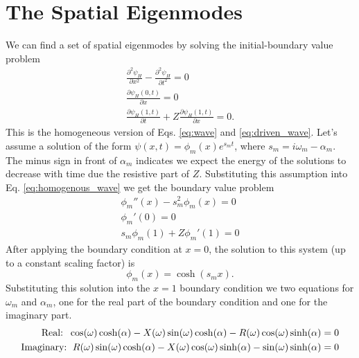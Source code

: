 \documentclass[superscriptaddress, onecolumn, prl]{revtex4}
\begin{document}
\section{The Spatial Eigenmodes}
We can find a set of spatial eigenmodes by solving the initial-boundary value problem
\begin{equation}
\label{eq:homogenous_wave}
\begin{split}
\frac{\partial^2 \psi_H}{\partial x^2} - \frac{\partial^2 \psi_H}{\partial t^2} = 0\\ 
\frac{\partial \psi_H (0,t)}{\partial x} = 0 \\ 
\frac{\partial \psi_H (1,t)}{\partial t} + Z \frac{\partial \psi_H (1,t)}{\partial x} = 0.
\end{split}
\end{equation} 
This is the homogeneous version of Eqs. \ref{eq:wave} and \ref{eq:driven_wave}. Let's assume a solution of the form $\psi(x,t)=\phi_m(x) e^{s_m t}$, where $s_m = i\omega_m - \alpha_m$. The minus sign in front of $\alpha_m$ indicates we expect the energy of the solutions to decrease with time due the resistive part of $Z$. Substituting this assumption into Eq. \ref{eq:homogenous_wave} we get the boundary value problem
\begin{equation}
\label{eq:spatial_problem}
\begin{split}
\phi_m''(x)-s_m^2 \phi_m(x) = 0 \\
\phi_m'(0)=0 \\
s_m \phi_m(1) + Z \phi_m'(1)=0
\end{split}
\end{equation} 
After applying the boundary condition at $x=0$, the solution to this system (up to a constant scaling factor) is
\begin{equation}
\phi_m(x) = \cosh(s_m x).
\end{equation}
Substituting this solution into the $x=1$ boundary condition we two equations for $\omega_m$ and $\alpha_m$, one for the real part of the boundary condition and one for the imaginary part.
\begin{equation}
\begin{split}
\label{eq:omega_alpha}
\text{Real: \thinspace} \cos(\omega) \cosh(\alpha) - X(\omega) \sin(\omega) \cosh(\alpha)  - R(\omega) \cos(\omega) \sinh(\alpha) = 0 \\
\text{Imaginary: \thinspace} R(\omega) \sin(\omega) \cosh(\alpha) - X(\omega) \cos(\omega) \sinh(\alpha) - \sin(\omega) \sinh(\alpha) = 0
\end{split}
\end{equation}
\end{document}
